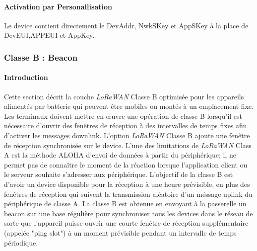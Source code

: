 \documentclass[11pt]{article}
\begin{document}
\paragraph{Activation par Personallisation }
Le device contient directement le DevAddr, NwkSKey et AppSKey à la place de DevEUI,APPEUI et AppKey.


\newpage
\subsubsection{Classe B : Beacon}
\paragraph{Introduction}
Cette section décrit la couche  \textit{LoRaWAN} Classe B optimisée pour les appareils alimentés par batterie qui peuvent être mobiles ou montés à un emplacement fixe.
Les terminaux doivent mettre en œuvre une opération de classe B lorsqu'il est nécessaire d'ouvrir des fenêtres de réception à des intervalles de temps fixes afin d'activer les messages downlink. L'option \textit{LoRaWAN} Classe B ajoute une fenêtre de réception synchronisée sur le device. L'une des limitations de \textit{LoRaWAN} Class A est la méthode ALOHA d'envoi de données à partir du périphérique; il ne permet pas de connaître le moment de la réaction lorsque l'application client ou le serveur souhaite s'adresser aux périphérique. L'objectif de la classe B est d'avoir un device disponible pour la réception à une heure prévisible, en plus des fenêtres de réception qui suivent la transmission aléatoire d'un méssage uplink du périphérique de classe A. La classe B est obtenue en envoyant à la passerelle un beacon sur une base régulière pour synchroniser tous les devices dans le réseau de sorte que l'appareil puisse ouvrir une courte fenêtre de réception supplémentaire (appelée "ping slot") à un moment prévisible pendant un intervalle de temps périodique.
\end{document}
